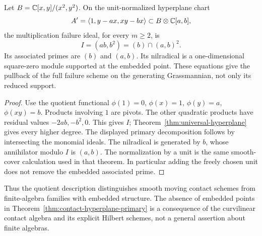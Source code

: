 \begin{proposition}\label{prop:noncurvilinear-embedded}
Let $B=\mathbb C[x,y]/(x^2,y^2)$. On the unit-normalized hyperplane chart
\[
 A'=\langle1,y-a x,xy-bx\rangle\subset B\otimes\mathbb C[a,b],
\]
the multiplication failure ideal, for every $m\ge2$, is
\[
 I=(ab,b^2)=(b)\cap(a,b)^2.
\]
Its associated primes are $(b)$ and $(a,b)$. Its nilradical is a
one-dimensional square-zero module supported at the embedded point.
These equations give the pullback of the full failure scheme on
the generating Grassmannian, not only its reduced support.
\end{proposition}
\begin{proof}
Use the quotient functional $\phi(1)=0$, $\phi(x)=1$,
$\phi(y)=a$, $\phi(xy)=b$. Products involving $1$ are pivots.
The other quadratic products have residual values $-2ab,-b^2,0$.
This gives $I$; Theorem~\ref{thm:universal-hyperplane} gives every
higher degree. The displayed primary decomposition follows by
intersecting the monomial ideals. The nilradical is generated by
$b$, whose annihilator modulo $I$ is $(a,b)$. The normalization by
a unit is the same smooth-cover calculation used in that theorem.
In particular adding the freely chosen unit does not remove the
embedded associated prime.
\end{proof}

Thus the quotient description distinguishes smooth moving contact
schemes from finite-algebra families with embedded structure. The
absence of embedded points in Theorem~\ref{thm:contact-hyperplane-primary}
is a consequence of the curvilinear contact algebra and its explicit
Hilbert schemes, not a general assertion about finite algebras.
